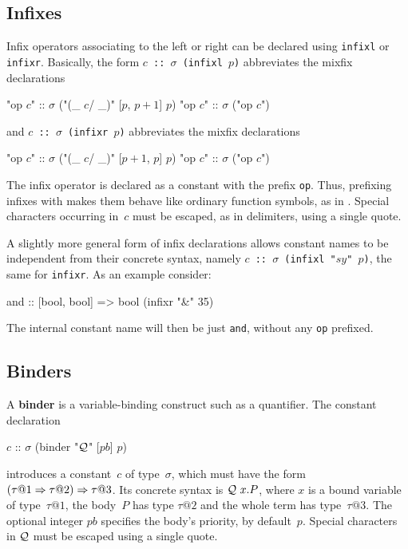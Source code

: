 

\subsection{Infixes}

Infix operators associating to the left or right can be declared using
{\tt infixl} or {\tt infixr}.  Basically, the form {\tt $c$ ::\ 
  $\sigma$ (infixl $p$)} abbreviates the mixfix declarations
\begin{ttbox}
"op \(c\)" :: \(\sigma\)   ("(_ \(c\)/ _)" [\(p\), \(p+1\)] \(p\))
"op \(c\)" :: \(\sigma\)   ("op \(c\)")
\end{ttbox}
and {\tt $c$ ::\ $\sigma$ (infixr $p$)} abbreviates the mixfix declarations
\begin{ttbox}
"op \(c\)" :: \(\sigma\)   ("(_ \(c\)/ _)" [\(p+1\), \(p\)] \(p\))
"op \(c\)" :: \(\sigma\)   ("op \(c\)")
\end{ttbox}
The infix operator is declared as a constant with the prefix {\tt op}.
Thus, prefixing infixes with \sdx{op} makes them behave like ordinary
function symbols, as in \ML.  Special characters occurring in~$c$ must be
escaped, as in delimiters, using a single quote.

A slightly more general form of infix declarations allows constant
names to be independent from their concrete syntax, namely \texttt{$c$
  ::\ $\sigma$\ (infixl "$sy$" $p$)}, the same for \texttt{infixr}. As
an example consider:
\begin{ttbox}
and :: [bool, bool] => bool  (infixr "&" 35)
\end{ttbox}
The internal constant name will then be just \texttt{and}, without any
\texttt{op} prefixed.


\subsection{Binders}
\begingroup
\def\Q{{\cal Q}}
A {\bf binder} is a variable-binding construct such as a quantifier.  The
constant declaration
\begin{ttbox}
\(c\) :: \(\sigma\)   (binder "\(\Q\)" [\(pb\)] \(p\))
\end{ttbox}
introduces a constant~$c$ of type~$\sigma$, which must have the form
$(\tau@1 \To \tau@2) \To \tau@3$.  Its concrete syntax is $\Q~x.P$, where
$x$ is a bound variable of type~$\tau@1$, the body~$P$ has type $\tau@2$
and the whole term has type~$\tau@3$. The optional integer $pb$
specifies the body's priority, by default~$p$.  Special characters
in $\Q$ must be escaped using a single quote.

